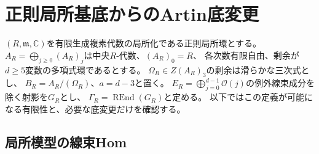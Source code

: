 \section{正則局所基底からのArtin底変更}\label{ar:sec:regular}

$(R,\mathfrak m,\mathbb C)$を有限生成複素代数の局所化である正則局所環とする。
$A_R=\bigoplus_{j\ge0}(A_R)_j$は中央$R$-代数、$(A_R)_0=R$、
各次数有限自由、剰余が$d\ge5$変数の多項式環であるとする。
$\Omega_R\in Z(A_R)_3$の剰余は滑らかな三次式とし、
$B_R=A_R/(\Omega_R)$、$a=d-3$と置く。
$E_R=\bigoplus_{j=0}^{d-1}\mathcal O(j)$の例外線束成分を除く射影を$G_R$とし、
$\Gamma_R=\operatorname{REnd}(G_R)$と定める。
以下ではこの定義が可能になる有限性と、必要な底変更だけを確認する。

\subsection{局所模型の線束Hom}

